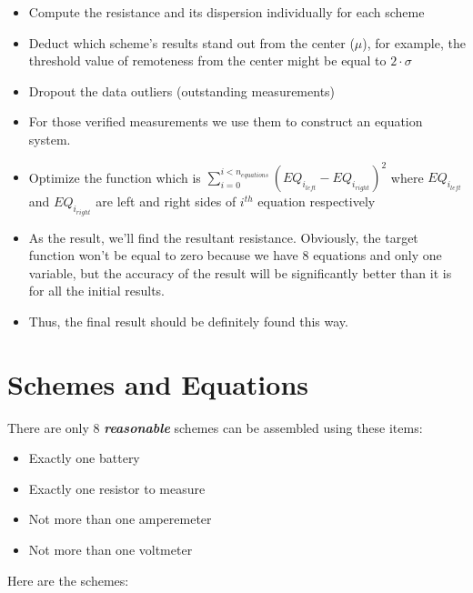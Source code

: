 \documentclass[11pt]{memoir}
\begin{document}
        \begin{itemize}
            \item Compute the resistance and its dispersion individually for each scheme
            \item Deduct which scheme's results stand out from the center ($\mu$), for example, the threshold value of remoteness from the center might be equal to $2 \cdot \sigma$
            \item Dropout the data outliers (outstanding measurements)
            \item For those verified measurements we use them to construct an equation system.
            \item Optimize the function which is ${\sum_{i=0}^{i<n_{equations}} \left(EQ_{i_{left}} - EQ_{i_{right}}\right) ^ 2}$\newline
                where $EQ_{i_{left}}$ and $EQ_{i_{right}}$ are left and right sides of $i^{th}$ equation respectively
            \item \label{itm:low-dispersion} As the result, we'll find the resultant resistance.\newline
            Obviously, the target function won't be equal to zero because we have 8 equations and only one variable, but the accuracy of the result will be significantly better than it is for all the initial results.
            \item Thus, the final result should be definitely found this way.
        \end{itemize}

    \section{Schemes and Equations}\label{sec:schemes-and-equations}
        There are only 8 \textit{\textbf{reasonable}} schemes can be assembled using these items:
        \begin{itemize}
            \item Exactly one battery
            \item Exactly one resistor to measure
            \item Not more than one amperemeter
            \item Not more than one voltmeter
        \end{itemize}

        Here are the schemes:

\end{document}
